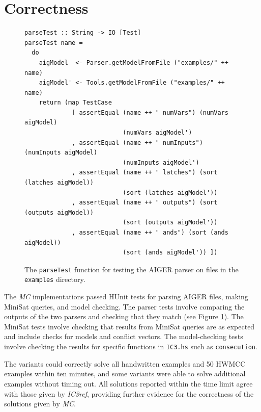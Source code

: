 \documentclass[12pt,a4paper,twoside,openright]{report}
\begin{document}
{{\section{Correctness}
\label{eval:solving}

\begin{figure}[t]
\begin{lstlisting}
parseTest :: String -> IO [Test]
parseTest name =
  do
    aigModel  <- Parser.getModelFromFile ("examples/" ++ name)
    aigModel' <- Tools.getModelFromFile ("examples/" ++ name)
    return (map TestCase
             [ assertEqual (name ++ " numVars") (numVars aigModel)
                           (numVars aigModel')
             , assertEqual (name ++ " numInputs") (numInputs aigModel)
                           (numInputs aigModel')
             , assertEqual (name ++ " latches") (sort (latches aigModel))
                           (sort (latches aigModel'))
             , assertEqual (name ++ " outputs") (sort (outputs aigModel))
                           (sort (outputs aigModel'))
             , assertEqual (name ++ " ands") (sort (ands aigModel))
                           (sort (ands aigModel')) ])
\end{lstlisting}
\caption{The {\tt parseTest} function for testing the AIGER parser on files in the {\tt examples} directory.}
\label{parseTest}
\end{figure}

The \emph{MC} implementations passed HUnit tests for parsing AIGER files,
making MiniSat queries, and model checking. The parser tests involve comparing
the outputs of the two parsers and checking that they match (see Figure
\ref{parseTest}). The MiniSat tests
involve checking that results from MiniSat queries are as expected and include checks
for models and conflict
vectors. The model-checking tests involve checking the results for specific
functions in \verb,IC3.hs, such as \verb,consecution,.

The variants could correctly solve all handwritten examples and 50 HWMCC examples
within ten minutes, and some
variants were able to solve additional examples without timing out.
All solutions reported within the time limit agree with those
given by \emph{IC3ref}, providing further evidence for the correctness of the solutions given
by \emph{MC}.

}}
\end{document}
